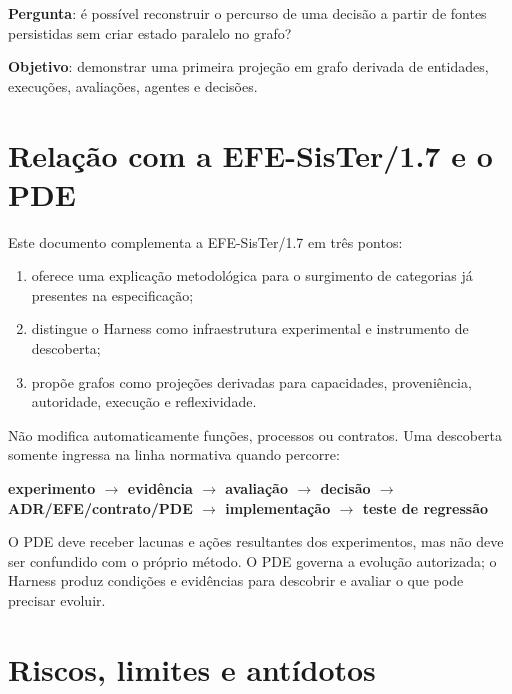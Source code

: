 \documentclass[11pt,a4paper,oneside]{article}
\begin{document}
\textbf{Pergunta}: é possível reconstruir o percurso de uma decisão a partir de fontes persistidas sem criar estado paralelo no grafo?

\textbf{Objetivo}: demonstrar uma primeira projeção em grafo derivada de entidades, execuções, avaliações, agentes e decisões.

\section{Relação com a EFE-SisTer/1.7 e o PDE}

Este documento complementa a EFE-SisTer/1.7 em três pontos:

\begin{enumerate}
  \item oferece uma explicação metodológica para o surgimento de categorias já presentes na especificação;
  \item distingue o Harness como infraestrutura experimental e instrumento de descoberta;
  \item propõe grafos como projeções derivadas para capacidades, proveniência, autoridade, execução e reflexividade.
\end{enumerate}

Não modifica automaticamente funções, processos ou contratos. Uma descoberta somente ingressa na linha normativa quando percorre:

\begin{principio}
\centering
\textbf{experimento $\rightarrow$ evidência $\rightarrow$ avaliação $\rightarrow$ decisão $\rightarrow$ ADR/EFE/contrato/PDE $\rightarrow$ implementação $\rightarrow$ teste de regressão}
\end{principio}

O PDE deve receber lacunas e ações resultantes dos experimentos, mas não deve ser confundido com o próprio método. O PDE governa a evolução autorizada; o Harness produz condições e evidências para descobrir e avaliar o que pode precisar evoluir.

\section{Riscos, limites e antídotos}
\end{document}
